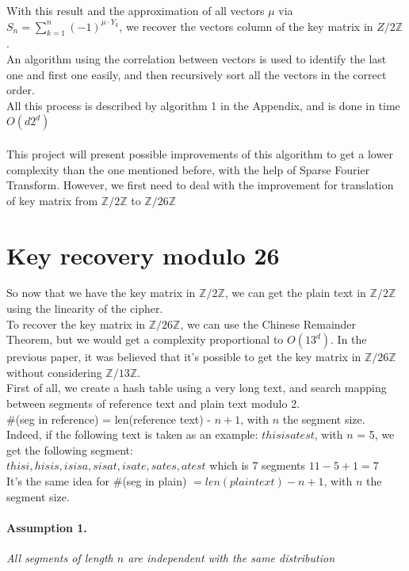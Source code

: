 \documentclass{article}
\begin{document}
With this result and the approximation of all vectors $\mu$ via $S_n = \sum_{k=1}^{n}{(-1)^{\mu \cdot Y_{k}}}$, we recover the vectors column of the key matrix in ${Z}/2\mathbb{Z}$.\\
An algorithm using the correlation between vectors is used to identify the last one and first one easily, and then recursively sort all the vectors in the correct order.\\
All this process is described by algorithm 1 in the Appendix, and is done in time $O(d 2^d)$\\
\\
This project will present possible improvements of this algorithm to get a lower complexity than the one mentioned before, with the help of Sparse Fourier Transform. However, we first need to deal with the improvement for translation of key matrix from $\mathbb{Z}/2\mathbb{Z}$ to $\mathbb{Z}/26\mathbb{Z}$


\section{Key recovery modulo 26}
So now that we have the key matrix in $\mathbb{Z}/2\mathbb{Z}$, we can get the plain text in $\mathbb{Z}/2\mathbb{Z}$ using the linearity of the cipher.\\
To recover the key matrix in $\mathbb{Z}/26\mathbb{Z}$, we can use the Chinese Remainder Theorem, but we would get a complexity proportional to $O(13^d)$. In the previous paper, it was believed that it's possible to get the key matrix in $\mathbb{Z}/26\mathbb{Z}$ without considering $\mathbb{Z}/13\mathbb{Z}$.\\
First of all, we create a hash table using a very long text, and search mapping between segments of reference text and plain text modulo 2.\\
\#(seg in reference) = len(reference text) - $n +1$, with $n$ the segment size.\\
Indeed, if the following text is taken as an example: $thisisatest$, with $n$ = 5, we get the following segment:\\
 $ thisi, hisis, isisa, sisat, isate, sates, atest $ which is 7 segments $ 11 - 5 + 1 = 7 $\\
It's the same idea for \#(seg in plain) $= len(plain text) - n +1$, with $n$ the segment size.\\
\paragraph{Assumption 1.}\textit{All segments of length $n$ are independent with the same distribution}
\end{document}
